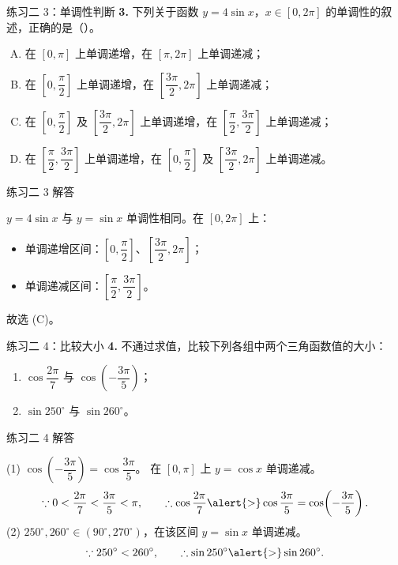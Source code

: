 \documentclass[10pt,aspectratio=169,serif]{beamer}
\begin{document}
\begin{frame}[t]{练习二 3：单调性判断}
\textbf{3.} 下列关于函数 $y=4\sin x$，$x\in[0,2\pi]$ 的单调性的叙述，正确的是（\quad ）。
\begin{enumerate}[(A)]
  \item 在 $[0,\pi]$ 上单调递增，在 $[\pi,2\pi]$ 上单调递减；
  \item 在 $\left[0,\dfrac{\pi}{2}\right]$ 上单调递增，在 $\left[\dfrac{3\pi}{2},2\pi\right]$ 上单调递减；
  \item 在 $\left[0,\dfrac{\pi}{2}\right]$ 及 $\left[\dfrac{3\pi}{2},2\pi\right]$ 上单调递增，在 $\left[\dfrac{\pi}{2},\dfrac{3\pi}{2}\right]$ 上单调递减；
  \item 在 $\left[\dfrac{\pi}{2},\dfrac{3\pi}{2}\right]$ 上单调递增，在 $\left[0,\dfrac{\pi}{2}\right]$ 及 $\left[\dfrac{3\pi}{2},2\pi\right]$ 上单调递减。
\end{enumerate}
\end{frame}

\begin{frame}[t]{练习二 3 解答}
\begin{tcolorbox}[colback=orange!10,colframe=orange,title=\textbf{解}]
$y=4\sin x$ 与 $y=\sin x$ 单调性相同。在 $[0,2\pi]$ 上：
\begin{itemize}
  \item 单调递增区间：$\left[0,\dfrac{\pi}{2}\right]$、$\left[\dfrac{3\pi}{2},2\pi\right]$；
  \item 单调递减区间：$\left[\dfrac{\pi}{2},\dfrac{3\pi}{2}\right]$。
\end{itemize}
故选 \alert{(C)}。
\end{tcolorbox}
\end{frame}

\begin{frame}[t]{练习二 4：比较大小}
\textbf{4.} 不通过求值，比较下列各组中两个三角函数值的大小：
\begin{enumerate}[(1)]
  \item $\cos\dfrac{2\pi}{7}$ 与 $\cos\!\left(-\dfrac{3\pi}{5}\right)$； \qquad
  \item $\sin 250^\circ$ 与 $\sin 260^\circ$。
\end{enumerate}
\end{frame}

\begin{frame}[t]{练习二 4 解答}
\begin{tcolorbox}[colback=orange!10,colframe=orange,title=\textbf{解}]
(1) $\cos\!\left(-\dfrac{3\pi}{5}\right)=\cos\dfrac{3\pi}{5}$。
在 $[0,\pi]$ 上 $y=\cos x$ 单调递减。
\[\because 0<\frac{2\pi}{7}<\frac{3\pi}{5}<\pi,\qquad
\therefore \cos\frac{2\pi}{7}\alert{>}\cos\frac{3\pi}{5}=\cos\!\left(-\frac{3\pi}{5}\right).
\]
(2) $250^\circ,260^\circ\in\left(90^\circ,270^\circ\right)$，在该区间 $y=\sin x$ 单调递减。
\[\because 250^\circ<260^\circ,\qquad \therefore \sin250^\circ\alert{>}\sin260^\circ.
\]
\end{tcolorbox}
\end{frame}
\end{document}
